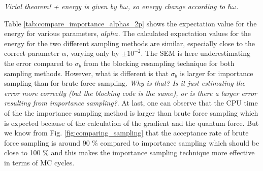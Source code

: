\textit{Virial theorem! + energy is given by $\hbar \omega$, so energy change according to $\hbar \omega$.}

Table \ref{tab:compare_importance_alphas_2p} shows the expectation value for the energy for various parameters, $alpha$.  The calculated expectation values for the energy for the two different sampling methods are similar, especially close to the correct parameter $\alpha$, varying only by $\pm 10^{-2}$. The SEM is here underestimating the error compared to $\sigma_b$ from the blocking resampling technique for both sampling methods. However, what is different is that $\sigma_b$ is larger for importance sampling than for brute force sampling. \textit{Why is that? Is it just estimating the error more correctly (but the blocking code is the same), or is there a larger error resulting from importance sampling?}. At last, one can observe that the CPU time of the the importance sampling method is larger than brute force sampling which is expected because of the calculation of the gradient and the quantum force. But we know from Fig. \ref{fig:comparing_sampling} that the acceptance rate of brute force sampling is around 90 \% compared to importance sampling which should be close to 100 \% and this makes the importance sampling technique more effective in terms of MC cycles.

